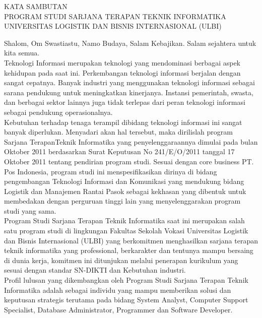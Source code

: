 \begin{center}
KATA SAMBUTAN\\
PROGRAM STUDI SARJANA TERAPAN TEKNIK INFORMATIKA\\
UNIVERSITAS LOGISTIK DAN BISNIS INTERNASIONAL (ULBI)\\[1cm]
\end{center}

Shalom, Om Swastiastu, Namo Budaya, Salam Kebajikan. Salam sejahtera untuk kita semua.\\

Teknologi Informasi merupakan teknologi yang mendominasi berbagai aspek kehidupan pada saat ini. Perkembangan teknologi informasi berjalan dengan sangat cepatnya. Banyak industri yang menggunakan teknologi informasi sebagai sarana pendukung untuk meningkatkan kinerjanya. Instansi pemerintah, swasta, dan berbagai sektor lainnya juga tidak terlepas dari peran teknologi informasi sebagai pendukung operasionalnya.\\

Kebutuhan terhadap tenaga terampil dibidang teknologi informasi ini sangat banyak diperlukan. Menyadari akan hal tersebut, maka dirilislah program Sarjana TerapanTeknik Informatika yang penyelenggaraannya dimulai pada bulan Oktober 2011 berdasarkan Surat Keputusan No 241/E/O/2011 tanggal 17 Oktober 2011 tentang pendirian program studi. Sesuai dengan core business PT. Pos Indonesia, program studi ini menspesifikasikan dirinya di bidang pengembangan Teknologi Informasi dan Komunikasi yang mendukung bidang Logistik dan Manajemen Rantai Pasok sebagai kekhasan yang dibentuk untuk membedakan dengan perguruan tinggi lain yang menyelenggarakan program studi yang sama.\\

Program Studi Sarjana Terapan Teknik Informatika saat ini merupakan salah satu program studi di lingkungan Fakultas Sekolah Vokasi Universitas Logistik dan Bisnis Internasional (ULBI) yang berkomitmen menghasilkan sarjana terapan teknik informatika yang professional, berkarakter dan tentunya mampu bersaing di dunia kerja, komitmen ini ditunjukan melalui penerapan kurikulum yang sesuai dengan standar SN-DIKTI dan Kebutuhan industri.\\

Profil lulusan yang dikembangkan oleh Program Studi Sarjana Terapan Teknik Informatika adalah sebagai individu yang mampu memberikan solusi dan keputusan strategis terutama pada bidang System Analyst, Computer Support Specialist, Database Administrator, Programmer dan Software Developer.\\

